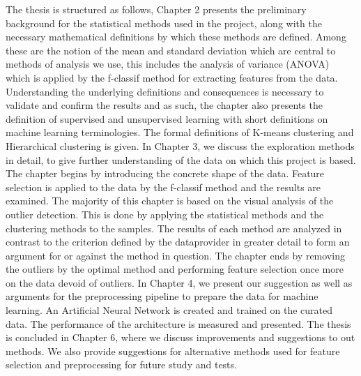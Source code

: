 The thesis is structured as follows, Chapter 2 presents the preliminary  background for the statistical methods used in the project, along with the necessary mathematical definitions by which these methods are defined. Among these are the notion of the mean and standard deviation which are central to methods of analysis we use, this includes the analysis of variance (ANOVA) which is applied by the f-classif method for extracting features from the data. Understanding the underlying definitions and consequences is necessary to validate and confirm the results and as such, the chapter also presents the definition of supervised and unsupervised learning with short definitions on machine learning terminologies. The formal definitions of K-means clustering and Hierarchical clustering is given. In Chapter 3, we discuss the exploration methods in detail, to give further understanding of the data on which this project is based. The chapter begins by introducing the concrete shape of the data. Feature selection is applied to the data by the f-classif method and the results are examined. The majority of this chapter is based on the visual analysis of the outlier detection. This is done by applying the statistical methods and the clustering methods to the samples. The results of each method are analyzed in contrast to the criterion defined by the dataprovider in greater detail to form an argument for or against the method in question. The chapter ends by removing the outliers by the optimal method and performing feature selection once more on the data devoid of outliers. In Chapter 4, we present our suggestion as well as arguments for the preprocessing pipeline to prepare the data for machine learning. An Artificial Neural Network is created and trained on the curated data. The performance of the architecture is measured and presented. The thesis is concluded in Chapter 6, where we discuss improvements and suggestions to out methods. We also provide suggestions for alternative methods used for feature selection and preprocessing for future study and tests.